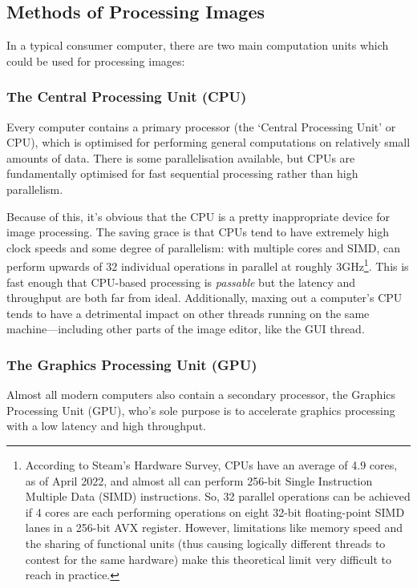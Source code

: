 \documentclass[12pt]{article}
\begin{document}
\subsection{Methods of Processing Images}

In a typical consumer computer, there are two main computation units which could be used for
processing images:

\subsubsection{The Central Processing Unit (CPU)}

Every computer contains a primary processor (the `Central Processing Unit' or CPU), which is
optimised for performing general computations on relatively small amounts of data.  There is some
parallelisation available, but CPUs are fundamentally optimised for fast sequential processing
rather than high parallelism.

Because of this, it's obvious that the CPU is a pretty inappropriate device for image processing.
The saving grace is that CPUs tend to have extremely high clock speeds and some degree of
parallelism: with multiple cores and SIMD, can perform upwards of 32 individual operations in
parallel at roughly 3GHz\footnote{According to Steam's Hardware Survey, CPUs have an average of 4.9
cores, as of April 2022, and almost all can perform 256-bit Single Instruction Multiple Data (SIMD)
instructions.  So, 32 parallel operations can be achieved if 4 cores are each performing operations
on eight 32-bit floating-point SIMD lanes in a 256-bit AVX register.  However, limitations like
memory speed and the sharing of functional units (thus causing logically different threads to
contest for the same hardware) make this theoretical limit very difficult to reach in practice.}.
This is fast enough that CPU-based processing is \emph{passable} but the latency and throughput are
both far from ideal.  Additionally, maxing out a computer's CPU tends to have a detrimental impact
on other threads running on the same machine---including other parts of the image editor, like the
GUI thread.

\subsubsection{The Graphics Processing Unit (GPU)}\label{sec:gpu}

Almost all modern computers also contain a secondary processor, the Graphics Processing Unit (GPU),
who's sole purpose is to accelerate graphics processing with a low latency and high throughput.
\end{document}
